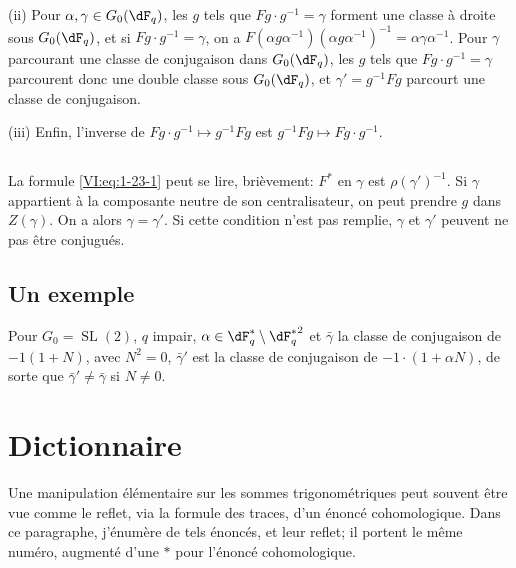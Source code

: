 (ii) Pour $\alpha,\gamma\in G_0(\dF_q)$, les $g$ tels que 
$F g\cdot g^{-1} = \gamma$ forment une classe à droite sous $G_0(\dF_q)$, et 
si $F g\cdot g^{-1} = \gamma$, on a 
$F(\alpha g \alpha^{-1})(\alpha g \alpha^{-1})^{-1} = \alpha \gamma\alpha^{-1}$. 
Pour $\gamma$ parcourant une classe de conjugaison dans $G_0(\dF_q)$, les $g$ 
tels que $F g\cdot g^{-1} = \gamma$ parcourent donc une double classe sous 
$G_0(\dF_q)$, et $\gamma'= g^{-1} F g$ parcourt une classe de conjugaison. 

(iii) Enfin, l'inverse de $F g\cdot g^{-1}\mapsto g^{-1} F g$ est 
$g^{-1} F g\mapsto F g\cdot g^{-1}$. 





\subsection{}\label{VI:1-25}

La formule \eqref{VI:eq:1-23-1} peut se lire, brièvement: $F^\ast$ en 
$\gamma$ est $\rho(\gamma')^{-1}$. Si $\gamma$ appartient à la composante 
neutre de son centralisateur, on peut prendre $g$ dans $Z(\gamma)$. On a alors 
$\gamma=\gamma'$. Si cette condition n'est pas remplie, $\gamma$ et $\gamma'$ 
peuvent ne pas être conjugués. 





\subsection{Un exemple}\label{VI:1-26}

Pour $G_0=\operatorname{SL}(2)$, $q$ impair, 
$\alpha\in \dF_q^\ast\setminus {\dF_q^\ast}^2$ et $\bar\gamma$ la classe de 
conjugaison de $-1(1+N)$, avec $N^2=0$, $\bar\gamma'$ est la classe de 
conjugaison de $-1\cdot (1+\alpha N)$, de sorte que $\bar\gamma'\ne \bar\gamma$ 
si $N\ne 0$. 










\section{Dictionnaire}\label{VI:2}

Une manipulation élémentaire sur les sommes trigonométriques peut souvent 
être vue comme le reflet, via la formule des traces, d'un énoncé 
cohomologique. Dans ce paragraphe, j'énumère de tels énoncés, et leur 
reflet; il portent le même numéro, augmenté d'une $\ast$ pour 
l'énoncé cohomologique. 





